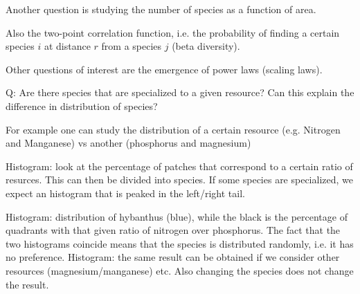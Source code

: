 \documentclass[../../main.tex]{subfiles}
\begin{document}
Another question is studying the number of species as a function of area.




Also the two-point correlation function, i.e. the probability of finding a certain species $i$ at distance $r$ from a species $j$ (beta diversity).

Other questions of interest are the emergence of power laws (scaling laws). 

Q: Are there species that are specialized to a given resource? Can this explain the difference in distribution of species?

For example one can study the distribution of a certain resource (e.g. Nitrogen and Manganese) vs another (phosphorus and magnesium)

Histogram: look at the percentage of patches that correspond to a certain ratio of resurces. This can then be divided into species. If some species are specialized, we expect an histogram that is peaked in the left/right tail.

Histogram: distribution of hybanthus (blue), while the black is the percentage of quadrants with that given ratio of nitrogen over phosphorus. The fact that the two histograms coincide means that the species is distributed randomly, i.e. it has no preference. 
Histogram: the same result can be obtained if we consider other resources (magnesium/manganese) etc.
Also changing the species does not change the result.

\end{document}
